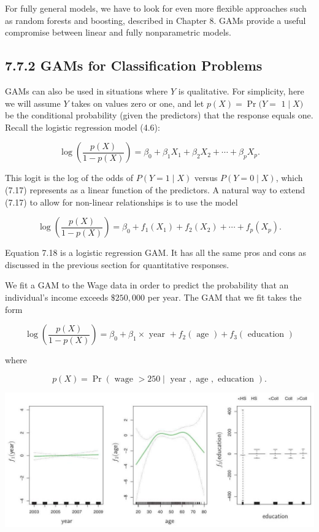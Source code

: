 \documentclass[10pt]{article}
\begin{document}
For fully general models, we have to look for even more flexible approaches such as random forests and boosting, described in Chapter 8. GAMs provide a useful compromise between linear and fully nonparametric models.

\subsection*{7.7.2 GAMs for Classification Problems}
GAMs can also be used in situations where $Y$ is qualitative. For simplicity, here we will assume $Y$ takes on values zero or one, and let $p(X)=\operatorname{Pr}(Y=$ $1 \mid X)$ be the conditional probability (given the predictors) that the response equals one. Recall the logistic regression model (4.6):


\begin{equation*}
\log \left(\frac{p(X)}{1-p(X)}\right)=\beta_{0}+\beta_{1} X_{1}+\beta_{2} X_{2}+\cdots+\beta_{p} X_{p} . \tag{7.17}
\end{equation*}


This logit is the log of the odds of $P(Y=1 \mid X)$ versus $P(Y=0 \mid X)$, which (7.17) represents as a linear function of the predictors. A natural way to extend (7.17) to allow for non-linear relationships is to use the model


\begin{equation*}
\log \left(\frac{p(X)}{1-p(X)}\right)=\beta_{0}+f_{1}\left(X_{1}\right)+f_{2}\left(X_{2}\right)+\cdots+f_{p}\left(X_{p}\right) . \tag{7.18}
\end{equation*}


Equation 7.18 is a logistic regression GAM. It has all the same pros and cons as discussed in the previous section for quantitative responses.

We fit a GAM to the Wage data in order to predict the probability that an individual's income exceeds $\$ 250,000$ per year. The GAM that we fit takes the form


\begin{equation*}
\log \left(\frac{p(X)}{1-p(X)}\right)=\beta_{0}+\beta_{1} \times \text { year }+f_{2}(\text { age })+f_{3}(\text { education }) \tag{7.19}
\end{equation*}


where

$$
p(X)=\operatorname{Pr}(\text { wage }>250 \mid \text { year }, \text { age }, \text { education }) .
$$

\begin{center}
\includegraphics[max width=\textwidth]{2025_05_05_efe77898333945044de4g-302}
\end{center}
\end{document}
